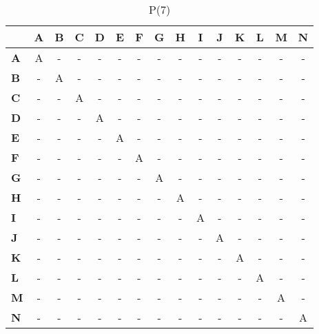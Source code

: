 \documentclass{article}
\begin{document}
\begin{table}[H]\centering
\caption{P(7)}
\begin{tabular}{l c c c c c c c c c c c c c c}
\toprule
 & \textbf{A} & \textbf{B} & \textbf{C} & \textbf{D} & \textbf{E} & \textbf{F} & \textbf{G} & \textbf{H} & \textbf{I} & \textbf{J} & \textbf{K} & \textbf{L} & \textbf{M} & \textbf{N}\\\midrule
\textbf{A} & A & - & - & - & - & - & - & - & - & - & - & - & - & - \\
\textbf{B} & - & A & - & - & - & - & - & - & - & - & - & - & - & - \\
\textbf{C} & - & - & A & - & - & - & - & - & - & - & - & - & - & - \\
\textbf{D} & - & - & - & A & - & - & - & - & - & - & - & - & - & - \\
\textbf{E} & - & - & - & - & A & - & - & - & - & - & - & - & - & - \\
\textbf{F} & - & - & - & - & - & A & - & - & - & - & - & - & - & - \\
\textbf{G} & - & - & - & - & - & - & A & - & - & - & - & - & - & - \\
\textbf{H} & - & - & - & - & - & - & - & A & - & - & - & - & - & - \\
\textbf{I} & - & - & - & - & - & - & - & - & A & - & - & - & - & - \\
\textbf{J} & - & - & - & - & - & - & - & - & - & A & - & - & - & - \\
\textbf{K} & - & - & - & - & - & - & - & - & - & - & A & - & - & - \\
\textbf{L} & - & - & - & - & - & - & - & - & - & - & - & A & - & - \\
\textbf{M} & - & - & - & - & - & - & - & - & - & - & - & - & A & - \\
\textbf{N} & - & - & - & - & - & - & - & - & - & - & - & - & - & A \\
\bottomrule
\end{tabular}
\end{table}
\end{document}
